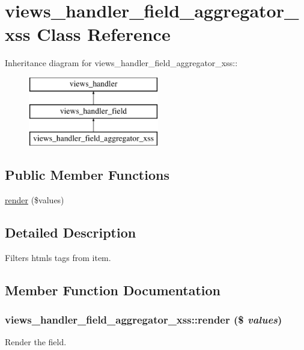 \hypertarget{classviews__handler__field__aggregator__xss}{
\section{views\_\-handler\_\-field\_\-aggregator\_\-xss Class Reference}
\label{classviews__handler__field__aggregator__xss}
}
Inheritance diagram for views\_\-handler\_\-field\_\-aggregator\_\-xss::\begin{figure}[H]
\begin{center}
\leavevmode
\includegraphics[height=3cm]{classviews__handler__field__aggregator__xss}
\end{center}
\end{figure}
\subsection*{Public Member Functions}
\begin{DoxyCompactItemize}
\item 
\hyperlink{classviews__handler__field__aggregator__xss_a0fb26b1adf6486a82441a2307971874e}{render} (\$values)
\end{DoxyCompactItemize}


\subsection{Detailed Description}
Filters htmls tags from item. 

\subsection{Member Function Documentation}
\hypertarget{classviews__handler__field__aggregator__xss_a0fb26b1adf6486a82441a2307971874e}{
\subsubsection[{render}]{\setlength{\rightskip}{0pt plus 5cm}views\_\-handler\_\-field\_\-aggregator\_\-xss::render (\$ {\em values})}}
\label{classviews__handler__field__aggregator__xss_a0fb26b1adf6486a82441a2307971874e}
Render the field.


